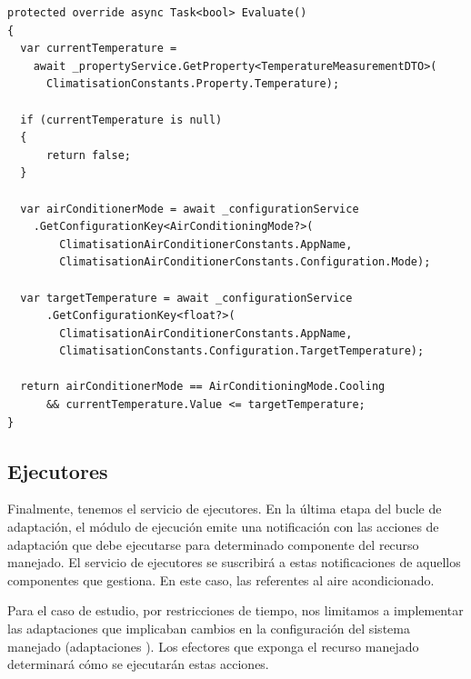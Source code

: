 \begin{lstlisting}[language={[Sharp]C},caption={Implementación de referencia del método \texttt{Evaluate}. La regla obtiene del conocimiento el estado actual del sistema y determina si debe ejecutarse.\protect\footnotemark},captionpos=b, label=ls:adaption-rule-evaluate-condition]
protected override async Task<bool> Evaluate()
{
  var currentTemperature =
    await _propertyService.GetProperty<TemperatureMeasurementDTO>(
      ClimatisationConstants.Property.Temperature);

  if (currentTemperature is null)
  {
      return false;
  }

  var airConditionerMode = await _configurationService
    .GetConfigurationKey<AirConditioningMode?>(
        ClimatisationAirConditionerConstants.AppName,
        ClimatisationAirConditionerConstants.Configuration.Mode);

  var targetTemperature = await _configurationService
      .GetConfigurationKey<float?>(
        ClimatisationAirConditionerConstants.AppName,
        ClimatisationConstants.Configuration.TargetTemperature);

  return airConditionerMode == AirConditioningMode.Cooling
      && currentTemperature.Value <= targetTemperature;
}
\end{lstlisting}


\subsection{Ejecutores}

Finalmente, tenemos el servicio de ejecutores. En la última etapa del bucle de adaptación, el módulo de ejecución emite una notificación con las acciones de adaptación que debe ejecutarse para determinado componente del recurso manejado. El servicio de ejecutores se suscribirá a estas notificaciones de aquellos componentes que gestiona. En este caso, las referentes al aire acondicionado.

Para el caso de estudio, por restricciones de tiempo, nos limitamos a implementar las adaptaciones que implicaban cambios en la configuración del sistema manejado (adaptaciones ). Los efectores que exponga el recurso manejado determinará cómo se ejecutarán estas acciones.

